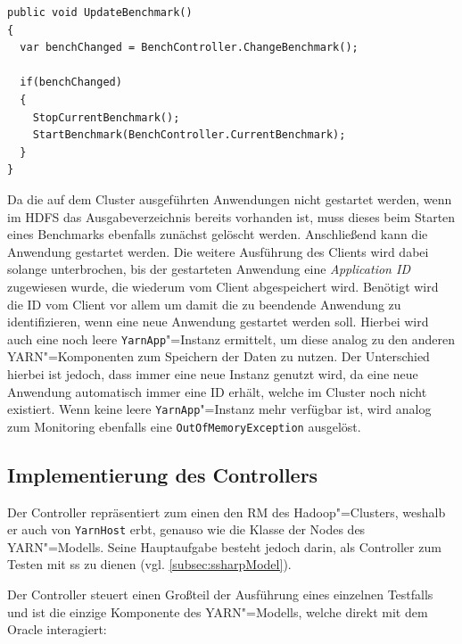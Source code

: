 \begin{lstlisting}[label=lst:startClientBenchmark,style=cs,
caption={[Auswahl und Start des nachfolgenden Benchmarks]
    Auswahl und Start des nachfolgenden Benchmarks (gekürzt).
    Der Benchmark Controller und seine Methode \texttt{BenchmarkController.ChangeBenchmark()} wird in \cref{sec:appImplementation} erläutert.}]
public void UpdateBenchmark()
{
  var benchChanged = BenchController.ChangeBenchmark();
  
  if(benchChanged)
  {
    StopCurrentBenchmark();
    StartBenchmark(BenchController.CurrentBenchmark);
  }
}
\end{lstlisting}

Da die auf dem Cluster ausgeführten Anwendungen \uU nicht gestartet werden, wenn im \ac{HDFS} das Ausgabeverzeichnis bereits vorhanden ist, muss dieses beim Starten eines Benchmarks ebenfalls zunächst gelöscht werden.
Anschließend kann die Anwendung gestartet werden.
Die weitere Ausführung des Clients wird dabei solange unterbrochen, bis der gestarteten Anwendung eine \emph{Application ID} zugewiesen wurde, die wiederum vom Client abgespeichert wird.
Benötigt wird die ID vom Client vor allem um damit die zu beendende Anwendung zu identifizieren, wenn eine neue Anwendung gestartet werden soll.
Hierbei wird auch eine noch leere \texttt{YarnApp}"=Instanz ermittelt, um diese analog zu den anderen \ac{YARN}"=Komponenten zum Speichern der Daten zu nutzen.
Der Unterschied hierbei ist jedoch, dass immer eine neue Instanz genutzt wird, da eine neue Anwendung automatisch immer eine ID erhält, welche im Cluster noch nicht existiert.
Wenn keine leere \texttt{YarnApp}"=Instanz mehr verfügbar ist, wird analog zum Monitoring ebenfalls eine \texttt{OutOfMemoryException} ausgelöst.

\subsection{Implementierung des Controllers}
\label{subsec:yarnController}

Der Controller repräsentiert zum einen den \ac{RM} des Hadoop"=Clusters, weshalb er auch von \texttt{YarnHost} erbt, genauso wie die Klasse der Nodes des \ac{YARN}"=Modells.
Seine Hauptaufgabe besteht jedoch darin, als Controller zum Testen mit \ac{ss} zu dienen (vgl. \cref{subsec:ssharpModel}).

Der Controller steuert einen Großteil der Ausführung eines einzelnen Testfalls und ist die einzige Komponente des \ac{YARN}"=Modells, welche direkt mit dem Oracle interagiert:

